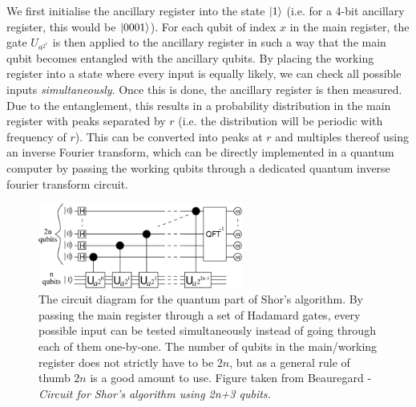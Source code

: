 \documentclass{article}[11pt]
\begin{document}
We first initialise the ancillary register into the state $\ket{1}$ (i.e. for a 4-bit ancillary register, this would be $\ket{0001}$).\cite{Shors_algorithm,candela} For each qubit of index $x$ in the main register, the gate $U_{a^{2^x}}$ is then applied to the ancillary register in such a way that the main qubit becomes entangled with the ancillary qubits. By placing the working register into a state where every input is equally likely, we can check all possible inputs \emph{simultaneously}. Once this is done, the ancillary register is then measured.\cite{candela} Due to the entanglement, this results in a probability distribution in the main register with peaks separated by $r$ (i.e. the distribution will be periodic with frequency of $r$). This can be converted into peaks at $r$ and multiples thereof using an inverse Fourier transform, which can be directly implemented in a quantum computer by passing the working qubits through a dedicated quantum inverse fourier transform circuit.\cite{candela,shorcircuit,Shors_algorithm}

\begin{figure}[H]
    \centering
    \includegraphics[width=0.6\textwidth]{Pictures/Shor's Circuit Diagram.png}
    \caption{The circuit diagram for the quantum part of Shor's algorithm. By passing the main register through a set of Hadamard gates, every possible input can be tested simultaneously instead of going through each of them one-by-one. The number of qubits in the main/working register does not strictly have to be $2n$, but as a general rule of thumb $2n$ is a good amount to use.\cite{candela} Figure taken from Beauregard - \emph{Circuit for Shor's algorithm using 2n+3 qubits.}\cite{shorcircuit}}
    \label{fig:shor_circuit}
\end{figure}
\end{document}
